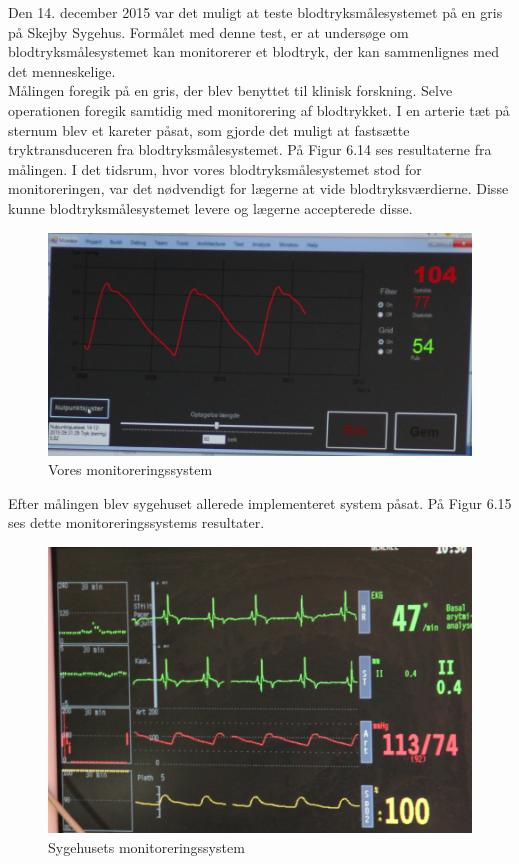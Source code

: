 Den 14. december 2015 var det muligt at teste blodtryksmålesystemet på en gris på Skejby Sygehus. Formålet med denne test, er at undersøge om blodtryksmålesystemet kan monitorerer et blodtryk, der kan sammenlignes med det menneskelige. \\
Målingen foregik på en gris, der blev benyttet til klinisk forskning. Selve operationen foregik samtidig med monitorering af blodtrykket. I en arterie tæt på sternum blev et kareter påsat, som gjorde det muligt at fastsætte tryktransduceren fra blodtryksmålesystemet. På Figur 6.14 ses resultaterne fra målingen. I det tidsrum, hvor vores blodtryksmålesystemet stod for monitoreringen, var det nødvendigt for lægerne at vide blodtryksværdierne. Disse kunne blodtryksmålesystemet levere og lægerne accepterede disse.

\begin{figure}[H]
	\centering
	\includegraphics[width=1\textwidth]{Figurer/Snip20151214_101}
	\caption{Vores monitoreringssystem}
\end{figure}

Efter målingen blev sygehuset allerede implementeret system påsat. På Figur 6.15 ses dette monitoreringssystems resultater.

\begin{figure}[H]
	\centering
	\includegraphics[width=1\textwidth]{Figurer/Snip20151214_102}
	\caption{Sygehusets monitoreringssystem}
\end{figure}


